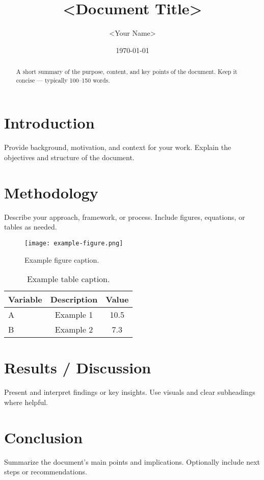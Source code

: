 \documentclass[12pt,a4paper]{article}
\title{<Document Title>}
\author{<Your Name>}
\date{\today}
\begin{document}
\maketitle
\thispagestyle{empty}

\begin{abstract}
A short summary of the purpose, content, and key points of the document.
Keep it concise — typically 100–150 words.
\end{abstract}

\newpage
\tableofcontents
\newpage


\section{Introduction}
Provide background, motivation, and context for your work. 
Explain the objectives and structure of the document.

\section{Methodology}
Describe your approach, framework, or process. 
Include figures, equations, or tables as needed.

\begin{figure}[H]
    \centering
    \texttt{[image: example-figure.png]}
    \caption{Example figure caption.}
\end{figure}

\begin{table}[H]
    \centering
    \begin{tabular}{lcc}
        \toprule
        Variable & Description & Value \\
        \midrule
        A & Example 1 & 10.5 \\
        B & Example 2 & 7.3 \\
        \bottomrule
    \end{tabular}
    \caption{Example table caption.}
\end{table}

\section{Results / Discussion}
Present and interpret findings or key insights. 
Use visuals and clear subheadings where helpful.

\section{Conclusion}
Summarize the document’s main points and implications. 
Optionally include next steps or recommendations.


\newpage


\end{document}
